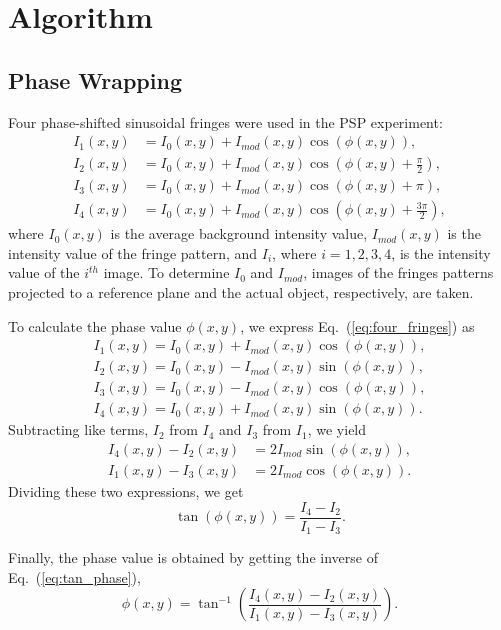 \section{Algorithm}

\subsection{Phase Wrapping}
Four phase-shifted sinusoidal fringes were used in the PSP experiment: 
\begin{align}
I_1(x,y)&=I_0(x,y) + I_{mod}(x,y)\cos{(\phi(x,y))}, \nonumber\\
I_2(x,y)&=I_0(x,y) + I_{mod}(x,y)\cos{(\phi(x,y)+\frac{\pi}{2})}, \nonumber\\
I_3(x,y)&=I_0(x,y) + I_{mod}(x,y)\cos{(\phi(x,y)+\pi)},\nonumber\\
I_4(x,y)&=I_0(x,y) + I_{mod}(x,y)\cos{(\phi(x,y)+\frac{3\pi}{2})},
\label{eq:four_fringes}
\end{align}  
where $I_0(x,y)$ is the average background intensity value, $I_{mod}(x,y)$ is the intensity value of the fringe pattern, and $I_i$, where $i=1,2,3,4$, is the intensity value of the $i^{th}$ image. To determine $I_0$ and $I_{mod}$, images of the fringes patterns projected to a reference plane and the actual object, respectively, are taken. 

To calculate the phase value $\phi(x,y)$, we express Eq.~(\ref{eq:four_fringes}) as 
\begin{align}
I_1(x,y)=I_0(x,y) + I_{mod}(x,y)\cos{(\phi(x,y))}, \nonumber\\
I_2(x,y)=I_0(x,y) - I_{mod}(x,y)\sin{(\phi(x,y))}, \nonumber\\
I_3(x,y)=I_0(x,y) - I_{mod}(x,y)\cos{(\phi(x,y))},\nonumber\\
I_4(x,y)=I_0(x,y) + I_{mod}(x,y)\sin{(\phi(x,y))}.
\label{eq:four_fringes2}
\end{align}  
Subtracting like terms, $I_2$ from $I_4$ and $I_3$ from $I_1$, we yield
\begin{align}
I_4(x,y)-I_2(x,y)&=2I_{mod}\sin{(\phi(x,y))}, \nonumber\\
I_1(x,y)-I_3(x,y)&=2I_{mod}\cos{(\phi(x,y))}.
\end{align}  
Dividing these two expressions, we get
\begin{equation}
\tan(\phi(x,y))=\frac{I_4-I_2}{I_1-I_3}.
\label{eq:tan_phase}
\end{equation}

Finally, the phase value is obtained by getting the inverse of Eq.~(\ref{eq:tan_phase}),
\begin{equation}
\phi(x,y)=\tan^{-1}{\left( \frac{I_4(x,y) - I_2(x,y)}{I_1(x,y)- I_3(x,y)}\right)}.
\label{eq:phase}
\end{equation}

